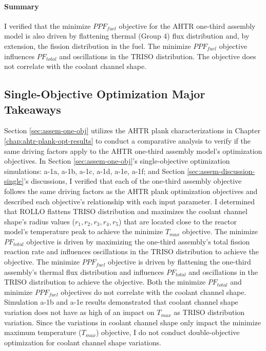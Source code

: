 \paragraph{Summary}
I verified that the minimize $PPF_{fuel}$ objective for the \gls{AHTR} one-third 
assembly model is also driven by flattening thermal (Group 4) flux distribution and,
by extension, the fission distribution in the fuel. 
The minimize $PPF_{fuel}$ objective influences $PF_{total}$ and oscillations in the 
TRISO distribution.
The objective does not correlate with the coolant channel shape.

\subsection{Single-Objective Optimization Major Takeaways}
Section \ref{sec:assem-one-obj} utilizes the \gls{AHTR} plank 
characterizations in Chapter \ref{chap:ahtr-plank-opt-results} to conduct
a comparative analysis to verify if the same driving factors apply to the 
\gls{AHTR} one-third assembly model's optimization objectives. 
In Section \ref{sec:assem-one-obj}'s single-objective optimization simulations: 
a-1a, a-1b, a-1c, a-1d, a-1e, a-1f; and Section \ref{sec:assem-discussion-single}'s 
discussions, I verified that each of the one-third assembly objective follows the 
same driving factors as the \gls{AHTR} plank optimization objectives and described 
each objective's relationship with each input parameter. 
I determined that \gls{ROLLO} flattens TRISO distribution and maximizes the coolant 
channel shape's radius values ($r_1, r_2, r_3, r_4, r_5$) that are located close to 
the reactor model's temperature peak to achieve the minimize $T_{max}$ objective. 
The minimize $PF_{total}$ objective is driven by maximizing the one-third assembly's 
total fission reaction rate and influences oscillations in the TRISO distribution to 
achieve the objective. 
The minimize $PPF_{fuel}$ objective is driven by flattening the one-third assembly's 
thermal flux distribution and influences $PF_{total}$ and oscillations in the TRISO 
distribution to achieve the objective. 
Both the minimize $PF_{total}$ and minimize $PPF_{fuel}$ objectives do not correlate
with the coolant channel shape. 
Simulation a-1b and a-1e results demonstrated that coolant channel shape variation 
does not have as high of an impact on $T_{max}$ as \gls{TRISO} distribution variation.
Since the variations in coolant channel shape only impact the minimize maximum 
temperature ($T_{max}$) objective, I do not conduct double-objective 
optimization for coolant channel shape variations.  

